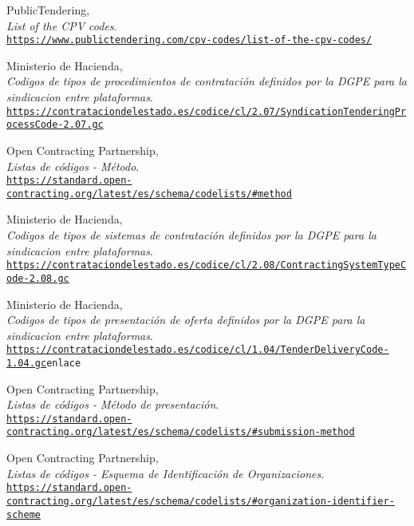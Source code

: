 \begin{thebibliography}{X}
            PublicTendering,
            \\ \textit{List of the CPV codes}.
            \\ \texttt{\url{https://www.publictendering.com/cpv-codes/list-of-the-cpv-codes/}}
            
            Ministerio de Hacienda,
            \\ \textit{Codigos de tipos de procedimientos de contratación definidos por la DGPE para la sindicacion entre plataformas}.
            \\ \texttt{\url{https://contrataciondelestado.es/codice/cl/2.07/SyndicationTenderingProcessCode-2.07.gc}}
            
            Open Contracting Partnership,
            \\ \textit{Listas de códigos - Método}.
            \\ \texttt{\url{https://standard.open-contracting.org/latest/es/schema/codelists/\#method}}
            
            Ministerio de Hacienda,
            \\ \textit{Codigos de tipos de sistemas de contratación definidos por la DGPE para la sindicacion entre plataformas}.
            \\ \texttt{\url{https://contrataciondelestado.es/codice/cl/2.08/ContractingSystemTypeCode-2.08.gc}}
            
            Ministerio de Hacienda,
            \\ \textit{Codigos de tipos de presentación de oferta definidos por la DGPE para la sindicacion entre plataformas}.
            \\ \texttt{\url{https://contrataciondelestado.es/codice/cl/1.04/TenderDeliveryCode-1.04.gc}{enlace}}
            
            Open Contracting Partnership,
            \\ \textit{Listas de códigos - Método de presentación}.
            \\ \texttt{\url{https://standard.open-contracting.org/latest/es/schema/codelists/\#submission-method}}
            
            Open Contracting Partnership,
            \\ \textit{Listas de códigos - Esquema de Identificación de Organizaciones}.
            \\ \texttt{\url{https://standard.open-contracting.org/latest/es/schema/codelists/\#organization-identifier-scheme}}
            

\end{thebibliography}
